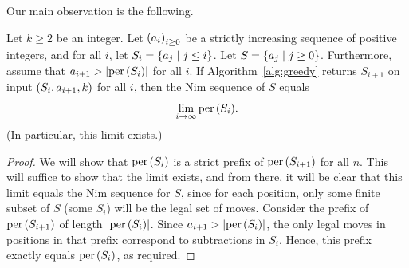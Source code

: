 \documentclass[english,12pt]{article}
\newcommand{\seq}{\p}
\DeclareMathOperator{\per}{per}
\begin{document}
Our main observation is the following.
\begin{prop}\label{prop:limalg}
Let $k\geq2$ be an integer.  Let $\seq{a_i}_{i\geq0}$ be a strictly increasing sequence of positive integers, and for all $i$, let $S_i=\left\{a_j\mid j\leq i\right\}$.  Let $S=\left\{a_j\mid j\geq0\right\}$.  Furthermore, assume that $a_{i+1}>\ab{\per\p{S_i}}$ for all $i$.  If Algorithm~\ref{alg:greedy} returns $S_{i+1}$ on input $\left(S_i, a_{i+1}, k\right)$ for all $i$, then the Nim sequence of $S$ equals
\[
\limi{i}{\per\p{S_i}}.
\]
(In particular, this limit exists.)
\end{prop}
\begin{proof}
We will show that $\per\p{S_i}$ is a strict prefix of $\per\p{S_{i+1}}$ for all $n$.  This will suffice to show that the limit exists, and from there, it will be clear that this limit equals the Nim sequence for $S$, since for each position, only some finite subset of $S$ (some $S_i$) will be the legal set of moves.  Consider the prefix of $\per\p{S_{i+1}}$ of length $\ab{\per\p{S_i}}$.  Since $a_{i+1}>\ab{\per\p{S_i}}$, the only legal moves in positions in that prefix correspond to subtractions in $S_i$.  Hence, this prefix exactly equals $\per\p{S_i}$, as required.
\end{proof}
%
\end{document}
